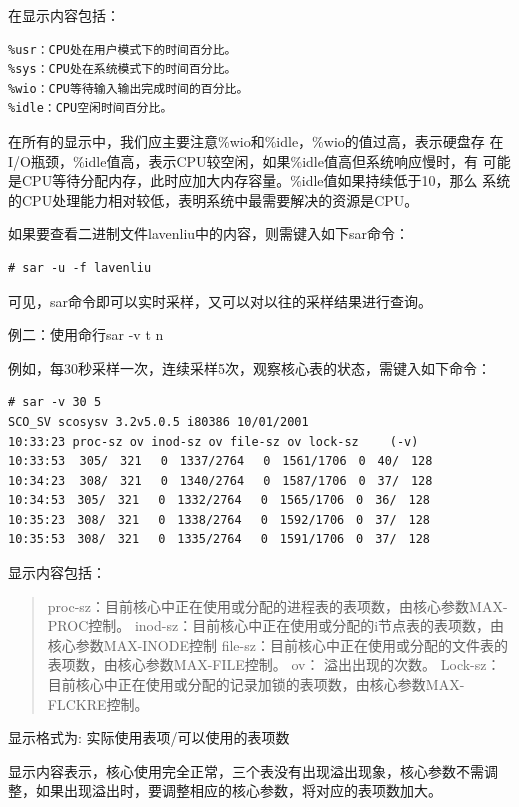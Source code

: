 在显示内容包括：

\begin{verbatim}
%usr：CPU处在用户模式下的时间百分比。
%sys：CPU处在系统模式下的时间百分比。
%wio：CPU等待输入输出完成时间的百分比。
%idle：CPU空闲时间百分比。
\end{verbatim}

在所有的显示中，我们应主要注意\%wio和\%idle，\%wio的值过高，表示硬盘存
在I/O瓶颈，\%idle值高，表示CPU较空闲，如果\%idle值高但系统响应慢时，有
可能是CPU等待分配内存，此时应加大内存容量。\%idle值如果持续低于10，那么
系统的CPU处理能力相对较低，表明系统中最需要解决的资源是CPU。

如果要查看二进制文件lavenliu中的内容，则需键入如下sar命令：

\begin{verbatim}
# sar -u -f lavenliu
\end{verbatim}

可见，sar命令即可以实时采样，又可以对以往的采样结果进行查询。

例二：使用命行sar -v t n

例如，每30秒采样一次，连续采样5次，观察核心表的状态，需键入如下命令：

\begin{verbatim}
# sar -v 30 5
SCO_SV scosysv 3.2v5.0.5 i80386 10/01/2001
10:33:23 proc-sz ov inod-sz ov file-sz ov lock-sz　　 (-v)
10:33:53  305/　321 　0　1337/2764　 0　1561/1706　0　40/　128
10:34:23  308/　321 　0　1340/2764　 0　1587/1706　0　37/　128
10:34:53　305/　321 　0　1332/2764　 0　1565/1706　0　36/　128
10:35:23　308/　321 　0　1338/2764　 0　1592/1706　0　37/　128
10:35:53　308/　321　 0　1335/2764　 0　1591/1706　0　37/　128
\end{verbatim}

显示内容包括：

\begin{quote}
proc-sz：目前核心中正在使用或分配的进程表的表项数，由核心参数MAX-PROC控制。
inod-sz：目前核心中正在使用或分配的i节点表的表项数，由核心参数MAX-INODE控制
file-sz：目前核心中正在使用或分配的文件表的表项数，由核心参数MAX-FILE控制。
ov：     溢出出现的次数。
Lock-sz：目前核心中正在使用或分配的记录加锁的表项数，由核心参数MAX-FLCKRE控制。
\end{quote}

显示格式为: 实际使用表项/可以使用的表项数

显示内容表示，核心使用完全正常，三个表没有出现溢出现象，核心参数不需调
整，如果出现溢出时，要调整相应的核心参数，将对应的表项数加大。


